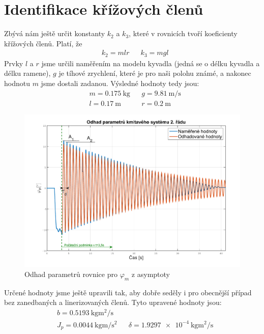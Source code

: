 \documentclass[a4paper,12pt]{article}
\begin{document}
\section{Identifikace křížových členů}
Zbývá nám ještě určit konstanty $k_2$ a $k_3$, které v rovnicích tvoří koeficienty křížových členů. Platí, že
\begin{align*}
&k_2 = mlr && k_3 = mgl
\end{align*}
Prvky $l$ a $r$ jsme určili naměřením na modelu kyvadla (jedná se o délku kyvadla a délku ramene), $g$ je tíhové zrychlení, které je pro naši polohu známé, a nakonec hodnotu $m$ jsme dostali zadanou. Výsledné hodnoty tedy jsou:
\begin{align*}
&m = \SI{0,175}{ \kilo \gram} &&g = \SI{9,81}{\meter \per \second}	\\
&l = \SI{0,17}{\meter} &&r = \SI{0,2}{\meter}
\end{align*}
\begin{figure}[H]
	\centering
    \includegraphics[scale=.6]{Odhad_phip}
    \caption{Odhad parametrů rovnice pro $\varphi_m$ z asymptoty}
\end{figure}





Určené hodnoty jsme ještě upravili tak, aby dobře seděly i pro obecnější případ bez zanedbaných a linerizovaných členů. Tyto upravené hodnoty jsou:
\begin{align*}
&b = \SI{0,5193}{\kilo \gram \meter \squared \per \second} \\
&J_p = \SI{0,0044}{\kilo \gram \metre \per \second \squared}	&&	\delta = \SI{1,9297e-4}{\kg \m \squared \per \second}
\end{align*}
\end{document}
